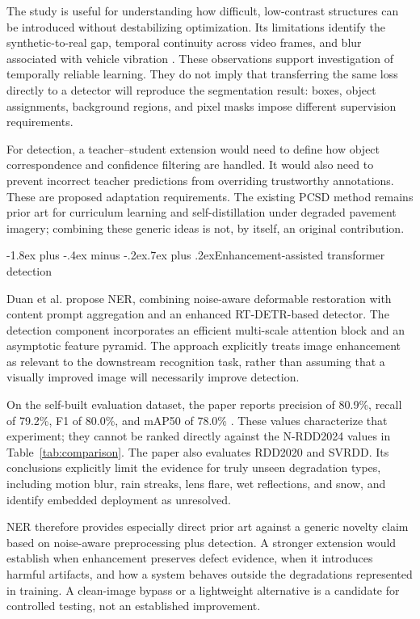 \documentclass[11pt,a4paper]{article}
\makeatletter
\renewcommand\subsection{\@startsection{subsection}{2}{\z@}%
  {-1.8ex plus -.4ex minus -.2ex}{.7ex plus .2ex}{\normalfont\normalsize\bfseries}}
\makeatother
\begin{document}
The study is useful for understanding how difficult, low-contrast structures can be introduced without destabilizing optimization. Its limitations identify the synthetic-to-real gap, temporal continuity across video frames, and blur associated with vehicle vibration \cite{r5}. These observations support investigation of temporally reliable learning. They do not imply that transferring the same loss directly to a detector will reproduce the segmentation result: boxes, object assignments, background regions, and pixel masks impose different supervision requirements.

For detection, a teacher--student extension would need to define how object correspondence and confidence filtering are handled. It would also need to prevent incorrect teacher predictions from overriding trustworthy annotations. These are proposed adaptation requirements. The existing PCSD method remains prior art for curriculum learning and self-distillation under degraded pavement imagery; combining these generic ideas is not, by itself, an original contribution.

\subsection{Enhancement-assisted transformer detection}

Duan et al. \cite{r6} propose NER, combining noise-aware deformable restoration with content prompt aggregation and an enhanced RT-DETR-based detector. The detection component incorporates an efficient multi-scale attention block and an asymptotic feature pyramid. The approach explicitly treats image enhancement as relevant to the downstream recognition task, rather than assuming that a visually improved image will necessarily improve detection.

On the self-built evaluation dataset, the paper reports precision of 80.9\%, recall of 79.2\%, F1 of 80.0\%, and mAP50 of 78.0\% \cite{r6}. These values characterize that experiment; they cannot be ranked directly against the N-RDD2024 values in Table~\ref{tab:comparison}. The paper also evaluates RDD2020 and SVRDD. Its conclusions explicitly limit the evidence for truly unseen degradation types, including motion blur, rain streaks, lens flare, wet reflections, and snow, and identify embedded deployment as unresolved.

NER therefore provides especially direct prior art against a generic novelty claim based on noise-aware preprocessing plus detection. A stronger extension would establish when enhancement preserves defect evidence, when it introduces harmful artifacts, and how a system behaves outside the degradations represented in training. A clean-image bypass or a lightweight alternative is a candidate for controlled testing, not an established improvement.
\end{document}
